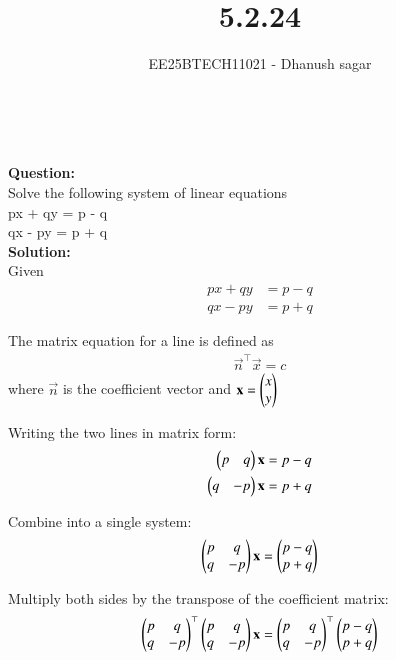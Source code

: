 \documentclass[journal]{IEEEtran}
\begin{document}


\title{5.2.24}
\author{EE25BTECH11021 - Dhanush sagar}
\maketitle \vspace{-1cm}
\renewcommand{\thefigure}{\theenumi}
\renewcommand{\thetable}{\theenumi}
\setlength{\intextsep}{10pt} %

\
\renewcommand{\thetable}{\theenumi}

\textbf{Question:} \\
Solve the following system of linear equations\\

px + qy = p - q \\
qx - py = p + q \\


\textbf{Solution:} \\
Given
\begin{align}
px + qy &= p - q \\
qx - py &= p + q
\end{align}

The matrix equation for a line is defined as
\begin{align}
\vec{n}^\top \vec{x} = c
\end{align}
where $\vec{n}$ is the coefficient vector and $\mathbf{x} = \begin{pmatrix}x\\y\end{pmatrix}$

Writing the two lines in matrix form:
\begin{align}
\begin{pmatrix}p & q\end{pmatrix} \mathbf{x} = p - q \\
\begin{pmatrix}q & -p\end{pmatrix} \mathbf{x} = p + q
\end{align}

Combine into a single system:
\begin{align}
\begin{pmatrix}p & q \\ q & -p\end{pmatrix} \mathbf{x} = \begin{pmatrix}p-q \\ p+q\end{pmatrix}
\end{align}

Multiply both sides by the transpose of the coefficient matrix:
\begin{align}
\begin{pmatrix}p & q \\ q & -p\end{pmatrix}^\top \begin{pmatrix}p & q \\ q & -p\end{pmatrix} \mathbf{x} = \begin{pmatrix}p & q \\ q & -p\end{pmatrix}^\top \begin{pmatrix}p-q \\ p+q\end{pmatrix}
\end{align}
\end{document}
